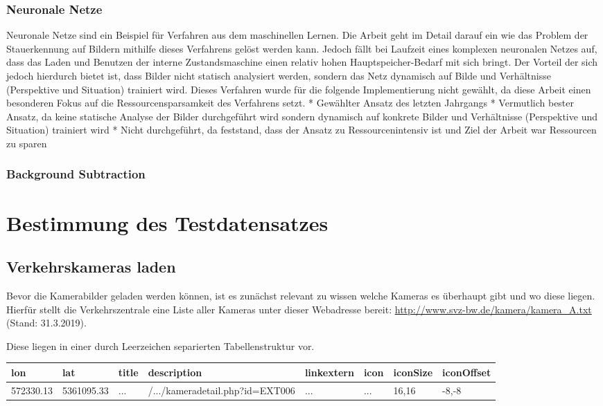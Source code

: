\subsubsection{Neuronale Netze}
Neuronale Netze sind ein Beispiel für Verfahren aus dem maschinellen Lernen. 
Die Arbeit \cite{hkkDhbw} geht im Detail darauf ein wie das Problem der Stauerkennung auf Bildern mithilfe dieses Verfahrens gelöst werden kann. 
Jedoch fällt bei Laufzeit eines komplexen neuronalen Netzes auf, dass das Laden und Benutzen der interne Zustandsmaschine einen relativ hohen Hauptspeicher-Bedarf mit sich bringt.
Der Vorteil der sich jedoch hierdurch bietet ist, dass Bilder nicht statisch analysiert werden, sondern das Netz dynamisch auf Bilde und Verhältnisse (Perspektive und Situation) trainiert wird.
Dieses Verfahren wurde für die folgende Implementierung nicht gewählt, da diese Arbeit einen besonderen Fokus auf die Ressourcensparsamkeit des Verfahrens setzt.
* Gewählter Ansatz des letzten Jahrgangs\newline
* Vermutlich bester Ansatz, da keine statische Analyse der Bilder durchgeführt wird\newline
	sondern dynamisch auf konkrete Bilder und Verhältnisse (Perspektive und Situation) trainiert wird
* Nicht durchgeführt, da feststand, dass der Ansatz zu Ressourcenintensiv ist und Ziel der Arbeit war Ressourcen zu sparen\newline

\subsubsection{Background Subtraction}

\section{Bestimmung des Testdatensatzes}
\subsection{Verkehrskameras laden}
Bevor die Kamerabilder geladen werden können, ist es zunächst relevant zu wissen welche Kameras es überhaupt gibt und wo diese liegen.
Hierfür stellt die Verkehrszentrale eine Liste aller Kameras unter dieser Webadresse bereit: \url{http://www.svz-bw.de/kamera/kamera_A.txt} (Stand: 31.3.2019).

Diese liegen in einer durch Leerzeichen separierten Tabellenstruktur vor.

\begin{center}
\scriptsize
    \begin{tabular}{ | l | l | l | l | l | l | l | l |}
    \hline
		lon & lat & title & description & linkextern & icon & iconSize & iconOffset \\ \hline
    572330.13 &
		5361095.33 &
		... &
		/.../kameradetail.php?id=EXT006 &
		... &
		... &
		16,16 &
		-8,-8 \\
    \hline
    \end{tabular}
\end{center}

